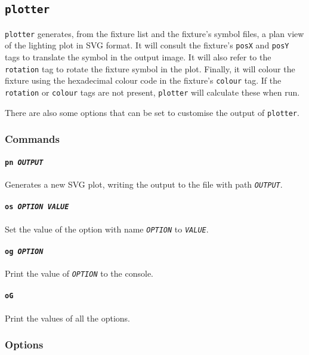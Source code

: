 \documentclass[a4paper]{article}
\begin{document}
\subsection{\texttt{plotter}}
\texttt{plotter} generates, from the fixture list and the fixture's symbol 
files, a plan view of the lighting plot in SVG format. It will consult the 
fixture's \texttt{posX} and \texttt{posY} tags to translate the symbol in 
the output image. It will also refer to the \texttt{rotation} tag to rotate 
the fixture symbol in the plot. Finally, it will colour the fixture using 
the hexadecimal colour code in the fixture's \texttt{colour} tag. If the 
\texttt{rotation} or \texttt{colour} tags are not present, \texttt{plotter} 
will calculate these when run.

There are also some options that can be set to customise the output of 
\texttt{plotter}.

\subsubsection{Commands}

\paragraph{\texttt{pn \textit{OUTPUT}}}
Generates a new SVG plot, writing the output to the file with path 
\texttt{\textit{OUTPUT}}.

\paragraph{\texttt{os \textit{OPTION VALUE}}}
Set the value of the option with name \texttt{\textit{OPTION}} to 
\texttt{\textit{VALUE}}.

\paragraph{\texttt{og \textit{OPTION}}}
Print the value of \texttt{\textit{OPTION}} to the console.

\paragraph{\texttt{oG}}
Print the values of all the options.

\subsubsection{Options}
\end{document}
